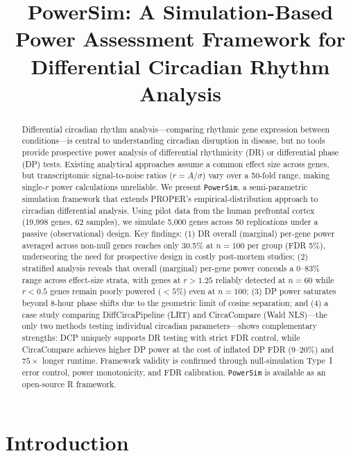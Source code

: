 \documentclass{article}
\title{PowerSim: A Simulation-Based Power Assessment Framework for Differential Circadian Rhythm Analysis}
\author{}
\date{}
\newcommand{\software}[1]{\texttt{#1}}
\begin{document}
\maketitle

\begin{abstract}
Differential circadian rhythm analysis—comparing rhythmic gene expression between conditions—is central to understanding circadian disruption in disease, but no tools provide prospective power analysis of differential rhythmicity (DR) or differential phase (DP) tests. Existing analytical approaches assume a common effect size across genes, but transcriptomic signal-to-noise ratios ($r = A/\sigma$) vary over a 50-fold range, making single-$r$ power calculations unreliable. We present \software{PowerSim}, a semi-parametric simulation framework that extends PROPER's empirical-distribution approach to circadian differential analysis. Using pilot data from the human prefrontal cortex (19,998 genes, 62 samples), we simulate 5,000 genes across 50 replications under a passive (observational) design. Key findings: (1) DR overall (marginal) per-gene power averaged across non-null genes reaches only 30.5\% at $n=100$ per group (FDR 5\%), underscoring the need for prospective design in costly post-mortem studies; (2) stratified analysis reveals that overall (marginal) per-gene power conceals a 0--83\% range across effect-size strata, with genes at $r > 1.25$ reliably detected at $n=60$ while $r < 0.5$ genes remain poorly powered ($<5\%$) even at $n = 100$; (3) DP power saturates beyond 8-hour phase shifts due to the geometric limit of cosine separation; and (4) a case study comparing DiffCircaPipeline (LRT) and CircaCompare (Wald NLS)—the only two methods testing individual circadian parameters—shows complementary strengths: DCP uniquely supports DR testing with strict FDR control, while CircaCompare achieves higher DP power at the cost of inflated DP FDR (9--20\%) and $75\times$ longer runtime. Framework validity is confirmed through null-simulation Type~I error control, power monotonicity, and FDR calibration. \software{PowerSim} is available as an open-source R framework.
\end{abstract}

\section{Introduction}
\end{document}
